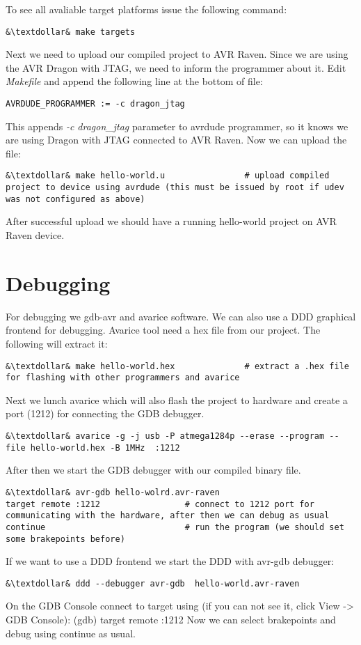 \documentclass{article}
\begin{document}
To see all avaliable target platforms issue the following command:
\begin{lstlisting}
&\textdollar& make targets
\end{lstlisting}

Next we need to upload our compiled project to AVR Raven.
Since we are using the AVR Dragon with JTAG, we need to inform the programmer about it.
Edit {\it{Makefile}} and append the following line at the bottom of file:
\begin{lstlisting}
AVRDUDE_PROGRAMMER := -c dragon_jtag
\end{lstlisting}

This appends {\it{-c dragon\_jtag}} parameter to avrdude programmer, so it knows we are using Dragon with JTAG connected to AVR Raven.
Now we can upload the file:
\begin{lstlisting}
&\textdollar& make hello-world.u                # upload compiled project to device using avrdude (this must be issued by root if udev was not configured as above)
\end{lstlisting}
After successful upload we should have a running hello-world project on AVR Raven device.


\section{Debugging}
For debugging we gdb-avr and avarice software. We can also use a DDD graphical frontend for debugging.
Avarice tool need a hex file from our project. The following will extract it:
\begin{lstlisting}
&\textdollar& make hello-world.hex              # extract a .hex file for flashing with other programmers and avarice
\end{lstlisting}

Next we lunch avarice which will also flash the project to hardware and create a port (1212) for connecting the GDB debugger.
\begin{lstlisting}
&\textdollar& avarice -g -j usb -P atmega1284p --erase --program --file hello-world.hex -B 1MHz  :1212
\end{lstlisting}
After then we start the GDB debugger with our compiled binary file.
\begin{lstlisting}
&\textdollar& avr-gdb hello-wolrd.avr-raven
target remote :1212                 # connect to 1212 port for communicating with the hardware, after then we can debug as usual
continue                            # run the program (we should set some brakepoints before)
\end{lstlisting}
If we want to use a DDD frontend we start the DDD with avr-gdb debugger:
\begin{lstlisting}
&\textdollar& ddd --debugger avr-gdb  hello-world.avr-raven
\end{lstlisting}
On the GDB Console connect to target using (if you can not see it, click View -> GDB Console):
(gdb) target remote :1212
Now we can select brakepoints and debug using continue as usual.
\end{document}
